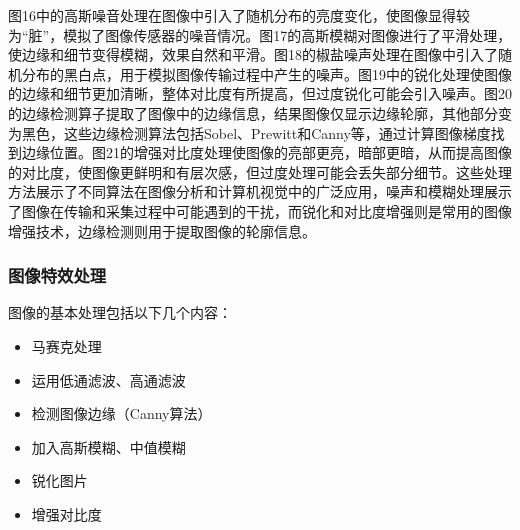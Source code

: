 \documentclass[a4paper,12pt]{article}
\begin{document}
图16中的高斯噪音处理在图像中引入了随机分布的亮度变化，使图像显得较为“脏”，模拟了图像传感器的噪音情况。图17的高斯模糊对图像进行了平滑处理，使边缘和细节变得模糊，效果自然和平滑。图18的椒盐噪声处理在图像中引入了随机分布的黑白点，用于模拟图像传输过程中产生的噪声。图19中的锐化处理使图像的边缘和细节更加清晰，整体对比度有所提高，但过度锐化可能会引入噪声。图20的边缘检测算子提取了图像中的边缘信息，结果图像仅显示边缘轮廓，其他部分变为黑色，这些边缘检测算法包括Sobel、Prewitt和Canny等，通过计算图像梯度找到边缘位置。图21的增强对比度处理使图像的亮部更亮，暗部更暗，从而提高图像的对比度，使图像更鲜明和有层次感，但过度处理可能会丢失部分细节。这些处理方法展示了不同算法在图像分析和计算机视觉中的广泛应用，噪声和模糊处理展示了图像在传输和采集过程中可能遇到的干扰，而锐化和对比度增强则是常用的图像增强技术，边缘检测则用于提取图像的轮廓信息。

\clearpage
\subsubsection{图像特效处理}
图像的基本处理包括以下几个内容：
\begin{itemize}
    \item 马赛克处理
    \item 运用低通滤波、高通滤波
    \item 检测图像边缘（Canny算法）
    \item 加入高斯模糊、中值模糊
    \item 锐化图片
    \item 增强对比度
\end{itemize}
\end{document}
